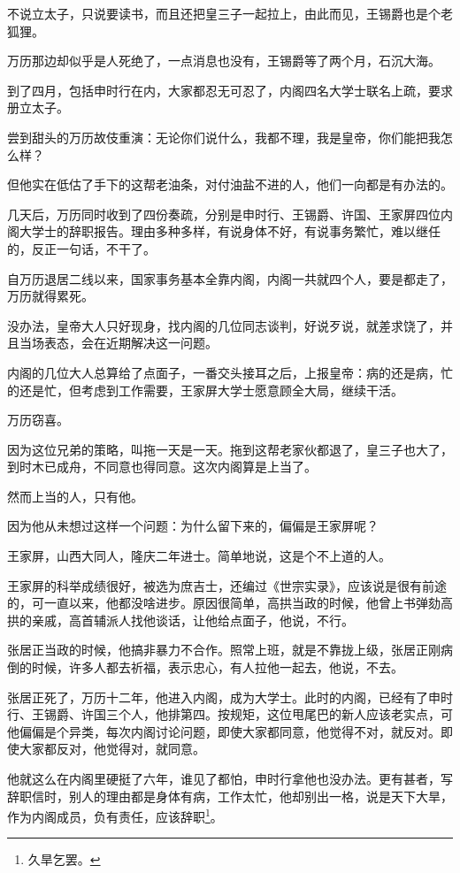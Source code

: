 \begin{multicols}{\theparacolNo}
不说立太子，只说要读书，而且还把皇三子一起拉上，由此而见，王锡爵也是个老狐狸。

万历那边却似乎是人死绝了，一点消息也没有，王锡爵等了两个月，石沉大海。

到了四月，包括申时行在内，大家都忍无可忍了，内阁四名大学士联名上疏，要求册立太子。

尝到甜头的万历故伎重演：无论你们说什么，我都不理，我是皇帝，你们能把我怎么样？

但他实在低估了手下的这帮老油条，对付油盐不进的人，他们一向都是有办法的。

几天后，万历同时收到了四份奏疏，分别是申时行、王锡爵、许国、王家屏四位内阁大学士的辞职报告。理由多种多样，有说身体不好，有说事务繁忙，难以继任的，反正一句话，不干了。

自万历退居二线以来，国家事务基本全靠内阁，内阁一共就四个人，要是都走了，万历就得累死。

没办法，皇帝大人只好现身，找内阁的几位同志谈判，好说歹说，就差求饶了，并且当场表态，会在近期解决这一问题。

内阁的几位大人总算给了点面子，一番交头接耳之后，上报皇帝：病的还是病，忙的还是忙，但考虑到工作需要，王家屏大学士愿意顾全大局，继续干活。

万历窃喜。

因为这位兄弟的策略，叫拖一天是一天。拖到这帮老家伙都退了，皇三子也大了，到时木已成舟，不同意也得同意。这次内阁算是上当了。

然而上当的人，只有他。

因为他从未想过这样一个问题：为什么留下来的，偏偏是王家屏呢？

王家屏，山西大同人，隆庆二年进士。简单地说，这是个不上道的人。

王家屏的科举成绩很好，被选为庶吉士，还编过《世宗实录》，应该说是很有前途的，可一直以来，他都没啥进步。原因很简单，高拱当政的时候，他曾上书弹劾高拱的亲戚，高首辅派人找他谈话，让他给点面子，他说，不行。

张居正当政的时候，他搞非暴力不合作。照常上班，就是不靠拢上级，张居正刚病倒的时候，许多人都去祈福，表示忠心，有人拉他一起去，他说，不去。

张居正死了，万历十二年，他进入内阁，成为大学士。此时的内阁，已经有了申时行、王锡爵、许国三个人，他排第四。按规矩，这位甩尾巴的新人应该老实点，可他偏偏是个异类，每次内阁讨论问题，即使大家都同意，他觉得不对，就反对。即使大家都反对，他觉得对，就同意。

他就这么在内阁里硬挺了六年，谁见了都怕，申时行拿他也没办法。更有甚者，写辞职信时，别人的理由都是身体有病，工作太忙，他却别出一格，说是天下大旱，作为内阁成员，负有责任，应该辞职\footnote{久旱乞罢。}。


\end{multicols}
